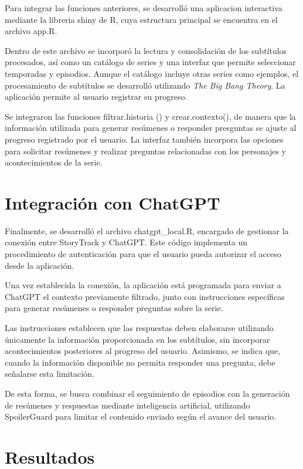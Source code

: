 \documentclass[
  spanish,
  12pt,
  letterpaper,
]{article}
\begin{document}
Para integrar las funciones anteriores, se desarrolló una aplicacion
interactiva mediante la libreria shiny de R, cuya estructura principal
se encuentra en el archivo app.R.

Dentro de este archivo se incorporó la lectura y consolidación de los
subtítulos procesados, así como un catálogo de series y una interfaz que
permite seleccionar temporadas y episodios. Aunque el catálogo incluye
otras series como ejemplos, el procesamiento de subtítulos se desarrolló
utilizando \emph{The Big Bang Theory}. La aplicación permite al usuario
registrar su progreso.

Se integraron las funciones filtrar.historia () y crear.contexto(), de
manera que la información utilizada para generar resúmenes o responder
presguntas se ajuste al progreso registrado por el usuario. La interfaz
también incorpora las opciones para solicitar resúmenes y realizar
preguntas relacionadas con los personajes y acontecimientos de la serie.

\section{Integración con ChatGPT}\label{integraciuxf3n-con-chatgpt}

Finalmente, se desarrolló el archivo chatgpt\_local.R, encargado de
gestionar la conexión entre StoryTrack y ChatGPT. Este código implementa
un procedimiento de autenticación para que el usuario pueda autorizar el
acceso desde la aplicación.

Una vez establecida la conexión, la aplicación está programada para
enviar a ChatGPT el contexto previamente filtrado, junto con
instrucciones específicas para generar resúmenes o responder preguntas
sobre la serie.

Las instrucciones establecen que las respuestas deben elaborarse
utilizando únicamente la información proporcionada en los subtítulos,
sin incorporar acontecimientos posteriores al progreso del usuario.
Asimismo, se indica que, cuando la información disponible no permita
responder una pregunta, debe señalarse esta limitación.

De esta forma, se busca combinar el seguimiento de episodios con la
generación de resúmenes y respuestas mediante inteligencia artificial,
utilizando SpoilerGuard para limitar el contenido enviado según el
avance del usuario.

\newpage

\section{Resultados}\label{resultados}
\end{document}
